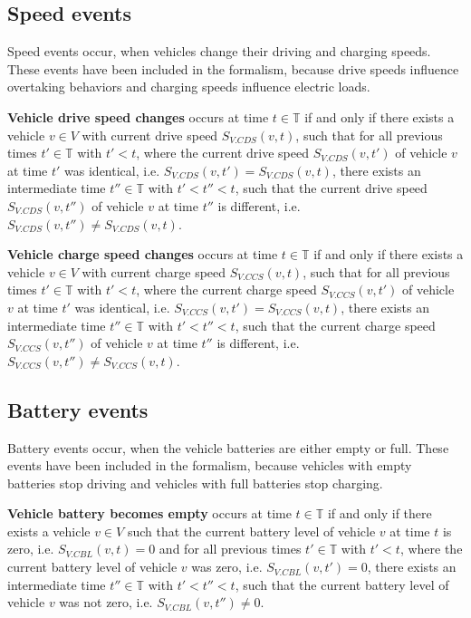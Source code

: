 \documentclass[graybox]{svmult}
\begin{document}
\subsection{Speed events}
\label{sec:speed-events}

Speed events occur, when vehicles change their driving and charging speeds.
These events have been included in the formalism, because drive speeds influence overtaking behaviors and charging speeds influence electric loads.

\vspace{2mm}
\noindent \textbf{Vehicle drive speed changes} occurs at time $t \in \mathbb{T}$ if and only if there exists a vehicle $v \in V$ with current drive speed $S_{V.CDS}(v, t)$, such that for all previous times $t' \in \mathbb{T}$ with $t' < t$, where the current drive speed $S_{V.CDS}(v,t')$ of vehicle $v$ at time $t'$ was identical, i.e. $S_{V.CDS}(v,t') = S_{V.CDS}(v,t)$, there exists an intermediate time $t'' \in \mathbb{T}$ with $t' < t'' < t$, such that the current drive speed $S_{V.CDS}(v,t'')$ of vehicle $v$ at time $t''$ is different, i.e. $S_{V.CDS}(v,t'') \neq S_{V.CDS}(v,t)$.

\vspace{2mm}
\noindent \textbf{Vehicle charge speed changes} occurs at time $t \in \mathbb{T}$ if and only if there exists a vehicle $v \in V$ with current charge speed $S_{V.CCS}(v, t)$, such that for all previous times $t' \in \mathbb{T}$ with $t' < t$, where the current charge speed $S_{V.CCS}(v,t')$ of vehicle $v$ at time $t'$ was identical, i.e. $S_{V.CCS}(v,t') = S_{V.CCS}(v,t)$, there exists an intermediate time $t'' \in \mathbb{T}$ with $t' < t'' < t$, such that the current charge speed $S_{V.CCS}(v,t'')$ of vehicle $v$ at time $t''$ is different, i.e. $S_{V.CCS}(v,t'') \neq S_{V.CCS}(v,t)$.


\subsection{Battery events}
\label{sec:battery-events}

Battery events occur, when the vehicle batteries are either empty or full.
These events have been included in the formalism, because vehicles with empty batteries stop driving and vehicles with full batteries stop charging.

\vspace{2mm}
\noindent \textbf{Vehicle battery becomes empty} occurs at time $t \in \mathbb{T}$ if and only if there exists a vehicle $v \in V$ such that the current battery level of vehicle $v$ at time $t$ is zero, i.e. $S_{V.CBL}(v,t) = 0$ and for all previous times $t' \in \mathbb{T}$ with $t' < t$, where the current battery level of vehicle $v$ was zero, i.e. $S_{V.CBL}(v,t') = 0$, there exists an intermediate time $t'' \in \mathbb{T}$ with $t' < t'' < t$, such that the current battery level of vehicle $v$ was not zero, i.e. $S_{V.CBL}(v,t'') \neq 0$.
\end{document}
